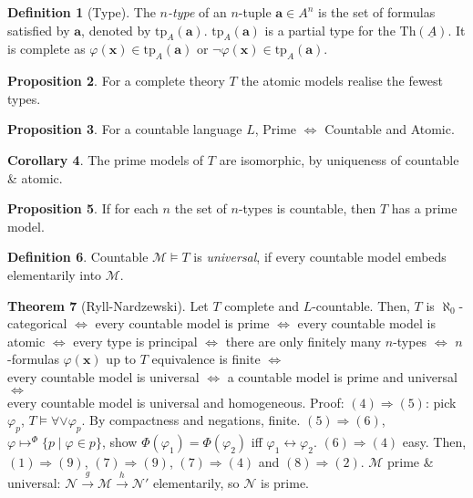 \documentclass[a4paper,10pt]{article}
\theoremstyle{definition}
\newtheorem{theorem}{Theorem}
\newtheorem{definition}[theorem]{Definition}
\newtheorem{corollary}[theorem]{Corollary}
\newtheorem{proposition}[theorem]{Proposition}
\let\vec\mathbf
\let\phi\varphi
\let\implies\Rightarrow
\begin{document}
\begin{definition}[Type]
    The \emph{$n$-type} of an $n$-tuple $\vec{a} \in A^n$ is the set of formulas satisfied by $\vec{a}$, denoted by $\mathrm{tp}_A(\vec{a})$. $\mathrm{tp}_A(\vec{a})$ is a partial type for the $\mathrm{Th}(\underline{A})$. It is complete as $\phi(\vec{x}) \in \mathrm{tp}_A(\vec{a})$ or $\neg \phi(\vec{x})\in \mathrm{tp}_A(\vec{a})$.    
\end{definition}

\begin{proposition}
    For a complete theory $T$ the atomic models realise the fewest types.
\end{proposition}

\begin{proposition}
    For a countable language $L$, Prime $\iff$ Countable and Atomic.
\end{proposition}

\begin{corollary}
    The prime models of $T$ are isomorphic, by uniqueness of countable \& atomic.
\end{corollary}

\begin{proposition}
    If for each $n$ the set of $n$-types is countable, then $T$ has a prime model.
\end{proposition}

\begin{definition}
    Countable $\mathcal{M} \models T$ is \emph{universal}, if every countable model embeds elementarily into $\mathcal{M}$.
\end{definition}

\begin{theorem}[Ryll-Nardzewski]
    Let $T$ complete and $L$-countable. Then, $T$ is $\aleph_0$-categorical $\iff$ every countable model is prime $\iff$ every countable model is atomic $\iff$ every type is principal $\iff$ there are only finitely many $n$-types $\iff$ $n$-formulas $\phi(\vec{x})$ up to $T$ equivalence is finite $\iff$ \\every countable model is universal $\iff$ a countable model is prime and universal $\iff$ \\ every countable model is universal and homogeneous. Proof: $(4) \implies (5)$: pick $\phi_p$, $T \models \forall \lor \phi_p$. By compactness and negations, finite. $(5) \implies (6)$, $\phi \mapsto^\Phi \{p \mid \phi \in p\}$, show $\Phi(\phi_1) = \Phi(\phi_2)$ iff $\phi_1 \leftrightarrow \phi_2$. $(6) \implies (4)$ easy. Then, $(1) \implies (9)$, $(7) \implies (9)$, $(7) \implies (4)$ and $(8) \implies (2)$. $\mathcal{M}$ prime \& universal: $\mathcal{N} \xrightarrow{g} \mathcal{M} \xrightarrow{h} \mathcal{N}'$ elementarily, so $\mathcal{N}$ is prime.
\end{theorem}
\end{document}
